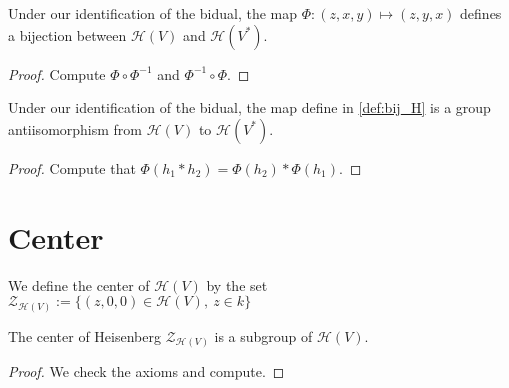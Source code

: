 \begin{definition}
    \label{def:bij_H}
    \leanok 

    Under our identification of the bidual, the map
    $\Phi : (z,x,y) \mapsto (z,y,x)$ defines a bijection 
    between $\mathcal{H}(V)$ and $\mathcal{H}(V^*)$.
    \begin{proof}
        \leanok
        Compute $\Phi\circ\Phi^{-1}$ and $\Phi^{-1}\circ\Phi$.
    \end{proof}
\end{definition}

\begin{definition}
    \label{prop:antiisoH}
    \leanok 

    Under our identification of the bidual, the map define in \ref{def:bij_H} is
    a group antiisomorphism from $\mathcal{H}(V)$ to $\mathcal{H}(V^*)$.
    \begin{proof}
        \leanok
        Compute that $\Phi(h_1*h_2)=\Phi(h_2)*\Phi(h_1)$.
    \end{proof}
\end{definition}

\section{Center}

\begin{definition}
    \label{def:center_H}
    \leanok 

    We define the center of $\mathcal{H}(V)$ by the set
    $\mathcal{Z}_{\mathcal{H}(V)}:=\{(z,0,0)\in\mathcal{H}(V),\ z\in k\}$
\end{definition}

\begin{proposition}
    \label{prop:center_H_subgroup}
    \leanok

    The center of Heisenberg $\mathcal{Z}_{\mathcal{H}(V)}$ is a subgroup
    of $\mathcal{H}(V)$.
\end{proposition}
\begin{proof}
    \leanok
    We check the axioms and compute.
\end{proof}


